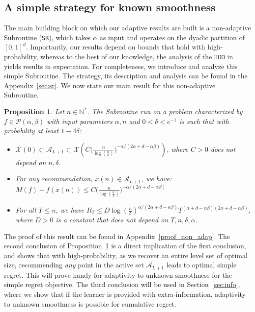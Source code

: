 \documentclass[final,12pt]{colt2018}
\newtheorem{prop}{Proposition}
\begin{document}
\subsection{A simple strategy for known smoothness}
The main building block on which our adaptive results are built is a non-adaptive Subroutine (\texttt{SR}), which takes $\alpha$ as input and operates on the dyadic partition of $[0,1]^d$. Importantly, our results depend on bounds that hold with high-probability, whereas to the best of our knowledge, the analysis of the $\texttt{HOO}$ in~\cite{bubeck2011x} yields results in expectation. For completeness, we introduce and analyze this simple Subroutine. The strategy, its description and analysis can be found in the Appendix~\ref{sec:sr}. We now state our main result for this non-adaptive Subroutine.
\begin{prop}\label{prop:non-adap}
Let $n \in \mathbb{N}^*$. The Subroutine run on a problem characterized by $f \in \mathcal{P}(\alpha,\beta)$ with input parameters $\alpha, n$ and $0<\delta< e^{-1}$ is such that with probability at least $1-4\delta$:
\begin{itemize}
\item $\mathcal X(0) \subset \mathcal A_{L+1} \subset \mathcal X\left(C\Big(\frac{n}{\log(\frac{n}{\delta})}\Big)^{-\alpha/(2\alpha + d - \alpha\beta)}\right)$, where $C>0$ does not depend on $n, \delta$.
\item For any recommendation, $x(n) \in \mathcal A_{L+1}$, we have: $M(f) - f(x(n)) \leq C\Big(\frac{n}{\log(\frac{n}{\delta})}\Big)^{-\alpha/(2\alpha + d - \alpha\beta)}$
\item For all $T \leq n$, we have $R_T \leq D\log(\frac{n}{\delta})^{\alpha/(2\alpha+d-\alpha\beta)}T^{(\alpha+d-\alpha\beta)(2\alpha+d-\alpha\beta)}$, where $D>0$ is a constant that does not depend on $T, n, \delta, \alpha$.
\end{itemize}
\end{prop}
The proof of this result can be found in Appendix~\ref{proof_non_adap}. The second conclusion of Proposition~\ref{prop:non-adap} is a direct implication of the first conclusion, and shows that with high-probability, as we recover an entire level set of optimal size, recommending \emph{any} point in the active set $\mathcal A_{L+1}$ leads to optimal simple regret. This will prove handy for adaptivity to unknown smoothness for the simple regret objective. The third conclusion will be used in Section~\ref{sec:info}, where we show that if the learner is provided with extra-information, adaptivity to unknown smoothness is possible for cumulative regret. 
\end{document}
